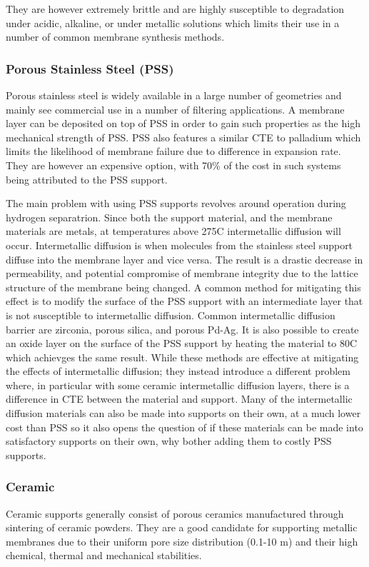 They are however extremely brittle and are highly susceptible to degradation under acidic, alkaline, or under metallic solutions which limits their use in a number of common membrane synthesis methods. \cite{MUKHERJEE2007107}

\subsubsection*{Porous Stainless Steel (PSS)}
Porous stainless steel is widely available in a large number of geometries and mainly see commercial use in a number of filtering applications. A membrane layer can be deposited on top of PSS in order to gain such properties as the high mechanical strength of PSS. PSS also features a similar CTE to palladium which limits the likelihood of membrane failure due to difference in expansion rate.  They are however an expensive option, with 70\% of the cost in such systems being attributed to the PSS support.

The main problem with using PSS supports revolves around operation during hydrogen separatrion. Since both the support material, and the membrane materials are metals, at temperatures above 275\textdegree C intermetallic diffusion will occur. Intermetallic diffusion is when molecules from the stainless steel support diffuse into the membrane layer and vice versa. The result is a drastic decrease in permeability, and potential compromise of membrane integrity due to the lattice structure of the membrane being changed. A common method for mitigating this effect is to modify the surface of the PSS support with an intermediate layer that is not susceptible to intermetallic diffusion. Common intermetallic diffusion barrier are zirconia, porous silica, and porous Pd-Ag.  \cite{Atsonios2015} It is also possible to create an oxide layer on the surface of the PSS support by heating the material to 80\textdegree C which achievges the same result. While these methods are effective at mitigating the effects of intermetallic diffusion; they instead introduce a different problem where, in particular with some ceramic intermetallic diffusion layers, there is a difference in CTE between the material and support. Many of the intermetallic diffusion materials can also be made into supports on their own, at a much lower cost than PSS so it also opens the question of if these materials can be made into satisfactory supports on their own, why bother adding them to costly PSS supports.

\subsubsection*{Ceramic}
Ceramic supports generally consist of porous ceramics manufactured through sintering of ceramic powders. They are a good candidate for supporting metallic membranes due to their uniform pore size distribution (0.1-10 \textmu m) and their high chemical, thermal and mechanical stabilities. 

